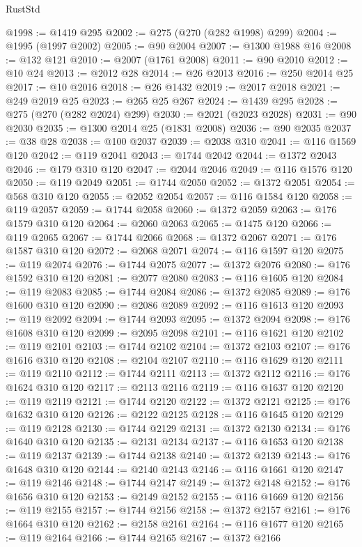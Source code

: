 \begin{lexlean}{RustStd}
\begin{coremodule}
@1998 := @1419 @295
@2002 := @275 (@270 (@282 @1998) @299)
@2004 := @1995 (@1997 @2002)
@2005 := @90 @2004
@2007 := @1300 @1988 @16
@2008 := @132 @121
@2010 := @2007 (@1761 @2008)
@2011 := @90 @2010
@2012 := @10 @24
@2013 := @2012 @28
@2014 := @26 @2013
@2016 := @250 @2014 @25
@2017 := @10 @2016
@2018 := @26 @1432
@2019 := @2017 @2018
@2021 := @249 @2019 @25
@2023 := @265 @25 @267
@2024 := @1439 @295
@2028 := @275 (@270 (@282 @2024) @299)
@2030 := @2021 (@2023 @2028)
@2031 := @90 @2030
@2035 := @1300 @2014 @25 (@1831 @2008)
@2036 := @90 @2035
@2037 := @38 @28
@2038 := @100 @2037
@2039 := @2038 @310
@2041 := @116 @1569 @120
@2042 := @119 @2041
@2043 := @1744 @2042
@2044 := @1372 @2043
@2046 := @179 @310 @120
@2047 := @2044 @2046
@2049 := @116 @1576 @120
@2050 := @119 @2049
@2051 := @1744 @2050
@2052 := @1372 @2051
@2054 := @568 @310 @120
@2055 := @2052 @2054
@2057 := @116 @1584 @120
@2058 := @119 @2057
@2059 := @1744 @2058
@2060 := @1372 @2059
@2063 := @176 @1579 @310 @120
@2064 := @2060 @2063
@2065 := @1475 @120
@2066 := @119 @2065
@2067 := @1744 @2066
@2068 := @1372 @2067
@2071 := @176 @1587 @310 @120
@2072 := @2068 @2071
@2074 := @116 @1597 @120
@2075 := @119 @2074
@2076 := @1744 @2075
@2077 := @1372 @2076
@2080 := @176 @1592 @310 @120
@2081 := @2077 @2080
@2083 := @116 @1605 @120
@2084 := @119 @2083
@2085 := @1744 @2084
@2086 := @1372 @2085
@2089 := @176 @1600 @310 @120
@2090 := @2086 @2089
@2092 := @116 @1613 @120
@2093 := @119 @2092
@2094 := @1744 @2093
@2095 := @1372 @2094
@2098 := @176 @1608 @310 @120
@2099 := @2095 @2098
@2101 := @116 @1621 @120
@2102 := @119 @2101
@2103 := @1744 @2102
@2104 := @1372 @2103
@2107 := @176 @1616 @310 @120
@2108 := @2104 @2107
@2110 := @116 @1629 @120
@2111 := @119 @2110
@2112 := @1744 @2111
@2113 := @1372 @2112
@2116 := @176 @1624 @310 @120
@2117 := @2113 @2116
@2119 := @116 @1637 @120
@2120 := @119 @2119
@2121 := @1744 @2120
@2122 := @1372 @2121
@2125 := @176 @1632 @310 @120
@2126 := @2122 @2125
@2128 := @116 @1645 @120
@2129 := @119 @2128
@2130 := @1744 @2129
@2131 := @1372 @2130
@2134 := @176 @1640 @310 @120
@2135 := @2131 @2134
@2137 := @116 @1653 @120
@2138 := @119 @2137
@2139 := @1744 @2138
@2140 := @1372 @2139
@2143 := @176 @1648 @310 @120
@2144 := @2140 @2143
@2146 := @116 @1661 @120
@2147 := @119 @2146
@2148 := @1744 @2147
@2149 := @1372 @2148
@2152 := @176 @1656 @310 @120
@2153 := @2149 @2152
@2155 := @116 @1669 @120
@2156 := @119 @2155
@2157 := @1744 @2156
@2158 := @1372 @2157
@2161 := @176 @1664 @310 @120
@2162 := @2158 @2161
@2164 := @116 @1677 @120
@2165 := @119 @2164
@2166 := @1744 @2165
@2167 := @1372 @2166

\end{coremodule}
\end{lexlean}
